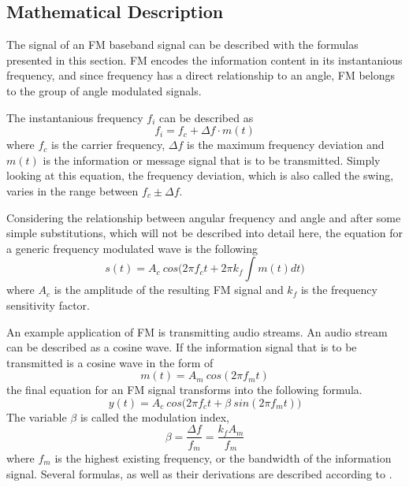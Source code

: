 \documentclass[conference]{IEEEtran}
\begin{document}
  \subsection{Mathematical Description}
    The signal of an FM baseband signal can be described with the formulas presented in this section.
    FM encodes the information content in its instantanious frequency, and since frequency has a direct relationship to an angle, FM belongs to the group of angle modulated signals.

    The instantanious frequency $f_i$ can be described as
    \begin{equation}
      f_i = f_c + \Delta f \cdot m(t)
    \end{equation}
    where $f_c$ is the carrier frequency, $\Delta f$ is the maximum frequency deviation and $m(t)$ is the information or message signal that is to be transmitted.
    Simply looking at this equation, the frequency deviation, which is also called the swing, varies in the range between $f_c \pm \Delta f$.

    Considering the relationship between angular frequency and angle and after some simple substitutions, which will not be described into detail here, the equation for a generic frequency modulated wave is the following
    \begin{equation}
      s(t) = A_c\ cos \Big( 2 \pi f_c t + 2 \pi k_f \int m(t) dt \Big)
      \label{equ_fm_func}
    \end{equation}
    where $A_c$ is the amplitude of the resulting FM signal and $k_f$ is the frequency sensitivity factor.

    An example application of FM is transmitting audio streams.
    An audio stream can be described as a cosine wave.
    If the information signal that is to be transmitted is a cosine wave in the form of
    \begin{equation}
      m(t) = A_m\ cos(2 \pi f_m t)
    \end{equation}
    the final equation for an FM signal transforms into the following formula.
    \begin{equation}
      y(t) = A_c\ cos \Big(2 \pi f_c t + \beta\ sin(2 \pi f_m t)\Big )
    \end{equation}
    The variable $\beta$ is called the modulation index,
    \begin{equation}
      \beta = \frac{\Delta f}{f_m} = \frac{k_f A_m}{f_m}
    \end{equation}
    where $f_m$ is the highest existing frequency, or the bandwidth of the information signal.
    Several formulas, as well as their derivations are described according to \cite{ref_FM_Maths_Info_1}\cite{ref_FMMaths2}.
\end{document}

